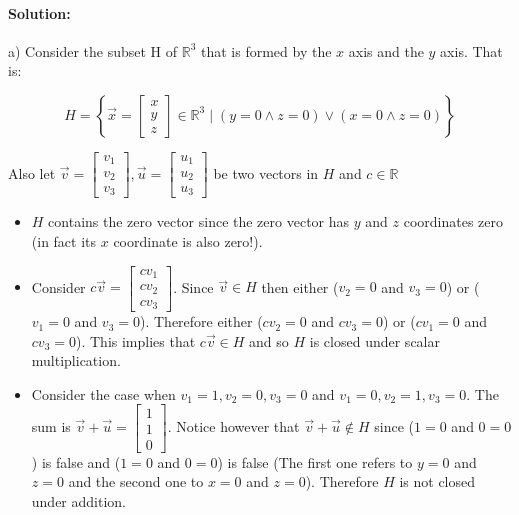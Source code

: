 \documentclass[12pt, letterpaper]{article}
\newcommand{\R}{\mathbb{R}}
\theoremstyle{statement}
\theoremstyle{statement}
\newenvironment{Solution}{\noindent\ignorespaces\paragraph{Solution:}}{\hfill \ding{122}\par\noindent}
\begin{document}
    \begin{Solution}

    a) Consider the subset H of $\R^3$ that is formed by the $x$ axis and the $y$ axis. That is:
    
    $$
    H = \left\{ \Vec{x} = \begin{bmatrix} x\\y\\z \end{bmatrix} \in \R^3 
    \mid
    (y = 0 \land z = 0) \lor (x=0 \land z=0)
    \right\}
    $$
    
    Also let $\Vec{v} = \begin{bmatrix} v_1\\v_2\\v_3\end{bmatrix}, \Vec{u} = \begin{bmatrix} u_1\\u_2\\u_3\end{bmatrix}$ be two vectors in $H$ and $c \in \R$
    
    \begin{itemize}
    \item $H$ contains the zero vector since the zero vector has $y$ and $z$ coordinates zero (in fact its $x$ coordinate is also zero!).
    
    \item Consider $c\Vec{v} = \begin{bmatrix} cv_1\\cv_2\\cv_3\end{bmatrix}$. Since $\Vec{v}\in H$ then either ($v_2 = 0$ and $v_3 = 0$) or ($v_1 = 0$ and $v_3 = 0$). Therefore either ($cv_2 = 0$ and $cv_3=0$) or ($cv_1 = 0$ and $cv_3 = 0$). This implies that $c\Vec{v} \in H$ and so $H$ is closed under scalar multiplication.
    
    \item Consider the case when $v_1=1, v_2=0, v_3=0$ and $v_1 = 0, v_2=1, v_3=0$. The sum is $\Vec{v}+\Vec{u}=\begin{bmatrix} 1 \\1 \\ 0\end{bmatrix}$. Notice however that $\Vec{v}+\Vec{u} \notin H$ since ($1=0$ and $0=0$) is false and ($1=0$ and $0=0$) is false (The first one refers to $y=0$ and $z=0$ and the second one to $x=0$ and $z=0$). Therefore $H$ is not closed under addition.
    

\end{itemize}
\end{Solution}
\end{document}
